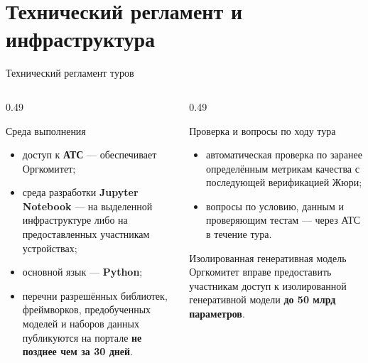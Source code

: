 \section{Технический регламент и инфраструктура}

\begin{frame}{Технический регламент туров}
  \vspace{0.2em}
  \begin{columns}[T]
    \begin{column}{0.49\textwidth}
      \begin{block}{Среда выполнения}
        \begin{itemize}\setlength\itemsep{0.25em}
          \item доступ к \textbf{АТС} --- обеспечивает Оргкомитет;
          \item среда разработки \textbf{Jupyter Notebook} ---
                на выделенной инфраструктуре либо на предоставленных
                участникам устройствах;
          \item основной язык --- \textbf{Python};
          \item перечни разрешённых библиотек, фреймворков,
                предобученных моделей и наборов данных публикуются
                на портале \textbf{не позднее чем за 30 дней}.
        \end{itemize}
      \end{block}
    \end{column}
    \begin{column}{0.49\textwidth}
      \begin{block}{Проверка и вопросы по ходу тура}
        \begin{itemize}\setlength\itemsep{0.25em}
          \item автоматическая проверка по заранее определённым
                метрикам качества с последующей верификацией Жюри;
          \item вопросы по условию, данным и проверяющим тестам ---
                через АТС в течение тура.
        \end{itemize}
      \end{block}
      \begin{block}{Изолированная генеративная модель}
        Оргкомитет вправе предоставить участникам доступ к изолированной
        генеративной модели \textbf{до 50 млрд параметров}.
      \end{block}
    \end{column}
  \end{columns}
\end{frame}
